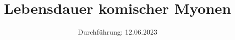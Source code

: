 

\subject{V01}
\title{Lebensdauer komischer Myonen}
\date{%
  Durchführung: 12.06.2023
}



\maketitle
\thispagestyle{empty}
\tableofcontents
\newpage






\printbibliography{}

\appendix
\newpage



